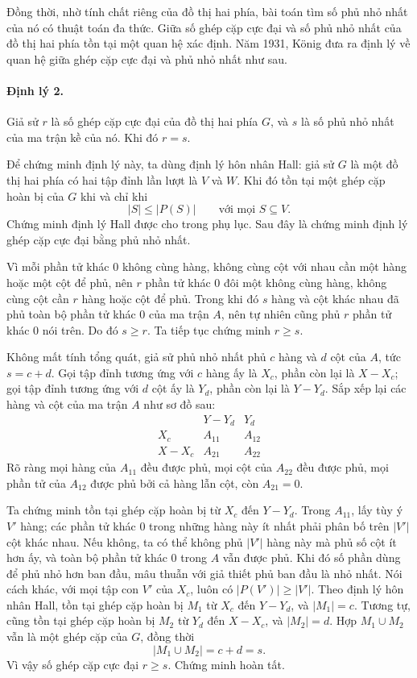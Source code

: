 \documentclass[11pt]{article}
\begin{document}
Đồng thời, nhờ tính chất riêng của đồ thị hai phía, bài toán tìm số phủ nhỏ
nhất của nó có thuật toán đa thức. Giữa số ghép cặp cực đại và số phủ nhỏ
nhất của đồ thị hai phía tồn tại một quan hệ xác định. Năm 1931, König đưa
ra định lý về quan hệ giữa ghép cặp cực đại và phủ nhỏ nhất như sau.

\paragraph{Định lý 2.}
Giả sử \(r\) là số ghép cặp cực đại của đồ thị hai phía \(G\), và \(s\) là
số phủ nhỏ nhất của ma trận kề của nó. Khi đó \(r=s\).

Để chứng minh định lý này, ta dùng định lý hôn nhân Hall: giả sử \(G\) là
một đồ thị hai phía có hai tập đỉnh lần lượt là \(V\) và \(W\). Khi đó tồn
tại một ghép cặp hoàn bị của \(G\) khi và chỉ khi
\[
  |S|\le |P(S)|\qquad\text{với mọi }S\subseteq V.
\]
Chứng minh định lý Hall được cho trong phụ lục. Sau đây là chứng minh định
lý ghép cặp cực đại bằng phủ nhỏ nhất.

Vì mỗi phần tử khác \(0\) không cùng hàng, không cùng cột với nhau cần một
hàng hoặc một cột để phủ, nên \(r\) phần tử khác \(0\) đôi một không cùng
hàng, không cùng cột cần \(r\) hàng hoặc cột để phủ. Trong khi đó \(s\) hàng
và cột khác nhau đã phủ toàn bộ phần tử khác \(0\) của ma trận \(A\), nên
tự nhiên cũng phủ \(r\) phần tử khác \(0\) nói trên. Do đó \(s\ge r\). Ta
tiếp tục chứng minh \(r\ge s\).

Không mất tính tổng quát, giả sử phủ nhỏ nhất phủ \(c\) hàng và \(d\) cột
của \(A\), tức \(s=c+d\). Gọi tập đỉnh tương ứng với \(c\) hàng ấy là
\(X_c\), phần còn lại là \(X-X_c\); gọi tập đỉnh tương ứng với \(d\) cột ấy
là \(Y_d\), phần còn lại là \(Y-Y_d\). Sắp xếp lại các hàng và cột của ma
trận \(A\) như sơ đồ sau:
\[
\begin{array}{c|cc}
 & Y-Y_d & Y_d\\ \hline
X_c & A_{11} & A_{12}\\
X-X_c & A_{21} & A_{22}
\end{array}
\]
Rõ ràng mọi hàng của \(A_{11}\) đều được phủ, mọi cột của \(A_{22}\) đều
được phủ, mọi phần tử của \(A_{12}\) được phủ bởi cả hàng lẫn cột, còn
\(A_{21}=0\).

Ta chứng minh tồn tại ghép cặp hoàn bị từ \(X_c\) đến \(Y-Y_d\). Trong
\(A_{11}\), lấy tùy ý \(V'\) hàng; các phần tử khác \(0\) trong những hàng
này ít nhất phải phân bố trên \(|V'|\) cột khác nhau. Nếu không, ta có thể
không phủ \(|V'|\) hàng này mà phủ số cột ít hơn ấy, và toàn bộ phần tử khác
\(0\) trong \(A\) vẫn được phủ. Khi đó số phần dùng để phủ nhỏ hơn ban đầu,
mâu thuẫn với giả thiết phủ ban đầu là nhỏ nhất. Nói cách khác, với mọi tập
con \(V'\) của \(X_c\), luôn có \(|P(V')|\ge |V'|\). Theo định lý hôn nhân
Hall, tồn tại ghép cặp hoàn bị \(M_1\) từ \(X_c\) đến \(Y-Y_d\), và
\(|M_1|=c\). Tương tự, cũng tồn tại ghép cặp hoàn bị \(M_2\) từ \(Y_d\) đến
\(X-X_c\), và \(|M_2|=d\). Hợp \(M_1\cup M_2\) vẫn là một ghép cặp của
\(G\), đồng thời
\[
  |M_1\cup M_2|=c+d=s.
\]
Vì vậy số ghép cặp cực đại \(r\ge s\). Chứng minh hoàn tất.
\end{document}
